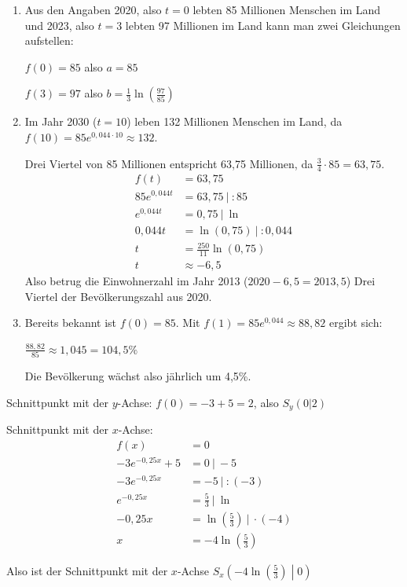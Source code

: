 \begin{Answer}[ref=eFktVA_3]
    \begin{enumerate}[label=\alph*)]
        \item Aus den Angaben 2020, also \(t=0\) lebten 85 Millionen Menschen im Land und 2023, also \(t=3\) lebten 97 Millionen im Land kann man zwei Gleichungen aufstellen:

        \(f(0)=85\) also \(a=85\)

        \(f(3)=97\) also \(b=\frac{1}{3}\ln\left(\frac{97}{85}\right)\)
        \item Im Jahr 2030 (\(t=10\)) leben 132 Millionen Menschen im Land, da \(f(10)=85e^{0,044\cdot10}\approx 132\).

        Drei Viertel von 85 Millionen entspricht 63,75 Millionen, da \(\frac{3}{4}\cdot 85=63,75\).
        \begin{align*}
            f(t)&=63,75\\
            85e^{0,044t}&=63,75\ \vert\ :85\\
            e^{0,044t}&=0,75\ \vert\ \ln\\
            0,044t&=\ln(0,75)\ \vert\ :0,044\\
            t&=\frac{250}{11}\ln(0,75)\\
            t&\approx-6,5
        \end{align*}
        Also betrug die Einwohnerzahl im Jahr 2013 (\(2020-6,5=2013,5\)) Drei Viertel der Bevölkerungszahl aus 2020.
        \item Bereits bekannt ist \(f(0)=85\). Mit \(f(1)=85e^{0,044}\approx88,82\) ergibt sich:

        \(\frac{88,82}{85}\approx1,045=104,5\%\)

        Die Bevölkerung wächst also jährlich um 4,5\%.
    \end{enumerate}
\end{Answer}
\begin{Answer}[ref=eFktVA_4]

    Schnittpunkt mit der \(y\)-Achse: \(f(0)=-3+5=2\), also \(S_y(0\vert2)\)

    Schnittpunkt mit der \(x\)-Achse:
    \begin{align*}
        f(x)&=0\\
        -3e^{-0,25x}+5&=0\ \vert\ -5\\
        -3e^{-0,25x}&=-5\ \vert\ :(-3)\\
        e^{-0,25x}&=\frac{5}{3}\ \big\vert\ \ln\\
        -0,25x&=\ln\left(\frac{5}{3}\right)\ \big\vert\ \cdot(-4)\\
        x&=-4\ln\left(\frac{5}{3}\right)
    \end{align*}

    \medskip

    Also ist der Schnittpunkt mit der \(x\)-Achse \(S_x\left(-4\ln\left(\frac{5}{3}\right)\middle\vert0\right)\)
\end{Answer}

